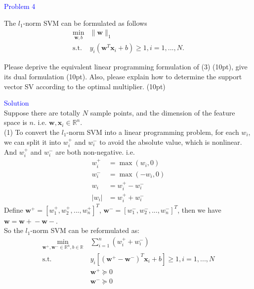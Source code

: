\textcolor{blue}{Problem 4}
\par The $l_1$-norm SVM can be formulated as follows
    \begin{equation}
       \begin{aligned}
        \min_{\mathbf{w},b} & \|\mathbf{w}\|_1 \\
        \text{s.t. }& y_i(\mathbf{w}^T\mathbf{x}_i+b)\geq 1,i=1,...,N.
    \end{aligned}
    \end{equation}

\par Please deprive the equivalent linear programming formulation of (3) (10pt), give its dual formulation (10pt). Also, please explain how to determine the support vector SV according to the optimal multiplier. (10pt)


\textcolor{blue}{Solution} \\
Suppose there are totally $N$ sample points, and the dimension of the feature space is $n$. i.e. $\mathbf{w}, \mathbf{x}_i \in \mathbb{R}^n$.\\

(1) To convert the $l_1$-norm SVM into a linear programming problem, for each $w_i$, we can split it into $w_i^+$ and $w_i^-$ to avoid the absolute value, which is nonlinear. And $w_i^+$ and $w_i^-$ are both non-negative.
i.e.
\begin{align*}
    w_i^+ &= \max(w_i, 0) \\
    w_i^- &= \max(-w_i, 0) \\
    w_i &= w_i^+ - w_i^- \\
    |w_i| &= w_i^+ + w_i^-
\end{align*}
Define $\mathbf{w^+}= [w_1^+, w_2^+, ..., w_n^+]^T$, $\mathbf{w^-}= [w_1^-, w_2^-, ..., w_n^-]^T$, then we have $\mathbf{w}= \mathbf{w+} - \mathbf{w-}$.\\
So the $l_1$-norm SVM can be reformulated as:
\begin{align*}
    \min_{\mathbf{w^+}, \mathbf{w^-}\in\mathbb{R}^n, b\in\mathbb{R}} &\ \sum_{i=1}^{n} (w_i^+ + w_i^-) \\
    \text{s.t. } &\ y_i\left[(\mathbf{w}^+-\mathbf{w}^-)^T\mathbf{x}_i+b\right]\geq 1,i=1,...,N \\
    &\ \mathbf{w}^+\succeq 0 \\
    &\ \mathbf{w}^-\succeq 0
\end{align*}


